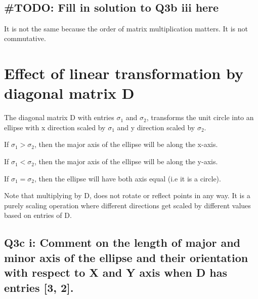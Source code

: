 \documentclass[11pt]{article}
\begin{document}
    \begin{center}
    \end{center}
    { \hspace*{\fill} \\}
    
    \hypertarget{todo-fill-in-solution-to-q3b-iii-here}{%
\subsection{\#TODO: Fill in solution to Q3b iii
here}\label{todo-fill-in-solution-to-q3b-iii-here}}

    It is not the same because the order of matrix multiplication matters.
It is not commutative.

    \hypertarget{effect-of-linear-transformation-by-diagonal-matrix-d}{%
\section{Effect of linear transformation by diagonal matrix
D}\label{effect-of-linear-transformation-by-diagonal-matrix-d}}

The diagonal matrix D with entries \(\sigma_1\) and \(\sigma_2\),
transforms the unit circle into an ellipse with x direction scaled by
\(\sigma_1\) and y direction scaled by \(\sigma_2\).

If \(\sigma_1 > \sigma_2\), then the major axis of the ellipse will be
along the x-axis.

If \(\sigma_1 < \sigma_2\), then the major axis of the ellipse will be
along the y-axis.

If \(\sigma_1 = \sigma_2\), then the ellipse will have both axis equal
(i.e it is a circle).

Note that multiplying by D, does not rotate or reflect points in any
way. It is a purely scaling operation where different directions get
scaled by different values based on entries of D.

    \hypertarget{q3c-i-comment-on-the-length-of-major-and-minor-axis-of-the-ellipse-and-their-orientation-with-respect-to-x-and-y-axis-when-d-has-entries-3-2.}{%
\subsection{Q3c i: Comment on the length of major and minor axis of the
ellipse and their orientation with respect to X and Y axis when D has
entries {[}3,
2{]}.}\label{q3c-i-comment-on-the-length-of-major-and-minor-axis-of-the-ellipse-and-their-orientation-with-respect-to-x-and-y-axis-when-d-has-entries-3-2.}}
\end{document}
